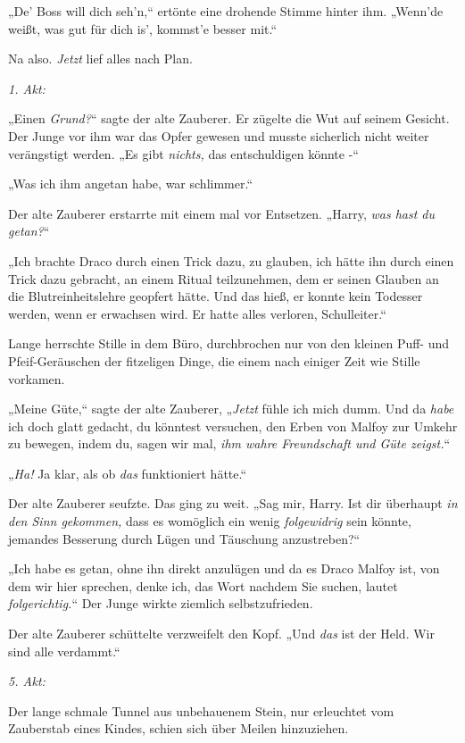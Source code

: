 {„De' Boss will dich seh'n,“ ertönte eine drohende Stimme hinter ihm. „Wenn'de weißt, was gut für dich is', kommst'e besser mit.“

Na also. \emph{Jetzt} lief alles nach Plan.

\later

\emph{1. Akt:}

„Einen \emph{Grund?}“ sagte der alte Zauberer. Er zügelte die Wut auf seinem Gesicht. Der Junge vor ihm war das Opfer gewesen und musste sicherlich nicht weiter verängstigt werden. „Es gibt \emph{nichts,} das entschuldigen könnte -“

„Was ich ihm angetan habe, war schlimmer.“

Der alte Zauberer erstarrte mit einem mal vor Entsetzen. „Harry, \emph{was hast du getan?}“

„Ich brachte Draco durch einen Trick dazu, zu glauben, ich hätte ihn durch einen Trick dazu gebracht, an einem Ritual teilzunehmen, dem er seinen Glauben an die Blutreinheitslehre geopfert hätte. Und das hieß, er konnte kein Todesser werden, wenn er erwachsen wird. Er hatte alles verloren, Schulleiter.“

Lange herrschte Stille in dem Büro, durchbrochen nur von den kleinen Puff- und Pfeif-Geräuschen der fitzeligen Dinge, die einem nach einiger Zeit wie Stille vorkamen.

„Meine Güte,“ sagte der alte Zauberer, „\emph{Jetzt} fühle ich mich dumm. Und da \emph{habe} ich doch glatt gedacht, du könntest versuchen, den Erben von Malfoy zur Umkehr zu bewegen, indem du, sagen wir mal, \emph{ihm wahre Freundschaft und Güte zeigst.}“

„\emph{Ha!} Ja klar, als ob \emph{das} funktioniert hätte.“

Der alte Zauberer seufzte. Das ging zu weit. „Sag mir, Harry. Ist dir überhaupt \emph{in den Sinn gekommen,} dass es womöglich ein wenig \emph{folgewidrig} sein könnte, jemandes Besserung durch Lügen und Täuschung anzustreben?“

„Ich habe es getan, ohne ihn direkt anzulügen und da es Draco Malfoy ist, von dem wir hier sprechen, denke ich, das Wort nachdem Sie suchen, lautet \emph{folgerichtig.}“ Der Junge wirkte ziemlich selbstzufrieden.

Der alte Zauberer schüttelte verzweifelt den Kopf. „Und \emph{das} ist der Held. Wir sind alle verdammt.“

\later

\emph{5. Akt:}

Der lange schmale Tunnel aus unbehauenem Stein, nur erleuchtet vom Zauberstab eines Kindes, schien sich über Meilen hinzuziehen.

}
